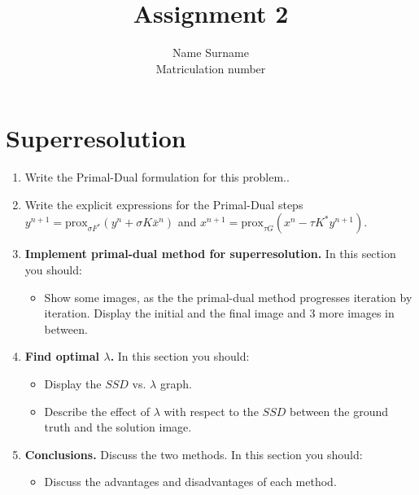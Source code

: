 \documentclass{paper}
\title{Assignment 2}
\author{Name Surname\\Matriculation number}
\begin{document}
\maketitle


%

\section*{Superresolution}


\begin{enumerate}

\item Write the Primal-Dual formulation for this problem..

\item Write the explicit expressions for the Primal-Dual steps $y^{n+1} = \text{prox}_{\sigma F^*} (y^n + \sigma K \bar{x}^n)$ and $x^{n+1} = \text{prox}_{\tau G} (x^n  - \tau K^* y^{n+1})$.


\item \textbf{Implement primal-dual method for superresolution.} In this section you should:

\begin{itemize}
\item Show some images, as the the primal-dual method progresses iteration by iteration. Display the initial and the final image and 3 more images in between.
\end{itemize}
\item \textbf{ Find optimal $\lambda$.} In this section you should:

\begin{itemize}
\item Display the $SSD$ vs. $\lambda$ graph.
\item Describe the effect of $\lambda$ with respect to the $SSD$ between the ground truth and the solution image.
\end{itemize}

\item \textbf{ Conclusions.} Discuss the two methods. In this section you should:
\begin{itemize}
\item Discuss the advantages and disadvantages of each method.
\end{itemize}
\end{enumerate}

 
\end{document}

